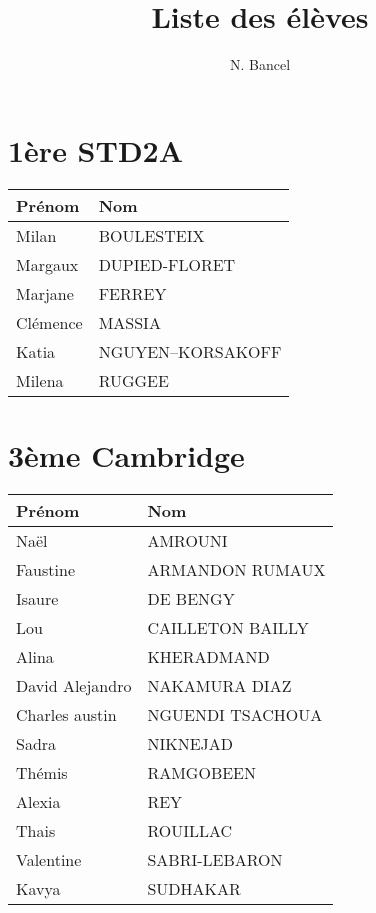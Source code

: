 \documentclass[a4paper,12pt]{article}
\begin{document}
\title{Liste des élèves}
\author{N. Bancel}

\sloppy  %
\maketitle

\section{1ère STD2A}

\begin{center}
  \begin{tabularx}{\textwidth}{||X X||}
    \hline
    \textbf{Prénom} & \textbf{Nom} \\
    \hline
    Milan & BOULESTEIX \\
    \hline
    Margaux & DUPIED-FLORET \\
    \hline
    Marjane & FERREY \\
    \hline
    Clémence & MASSIA \\
    \hline
    Katia & NGUYEN--KORSAKOFF \\
    \hline
    Milena & RUGGEE
  \end{tabularx}
  \end{center}


  \section{3ème Cambridge}

  \begin{center}
    \begin{tabularx}{\textwidth}{||X X||}
      \hline
      \textbf{Prénom} & \textbf{Nom} \\
      \hline
      Naël & AMROUNI  \\
      \hline
      Faustine & ARMANDON RUMAUX \\
      \hline
      Isaure & DE BENGY \\
      \hline
      Lou & CAILLETON BAILLY \\
      \hline
      Alina & KHERADMAND \\
      \hline
      David Alejandro & NAKAMURA DIAZ \\
      \hline
      Charles austin & NGUENDI TSACHOUA \\
      \hline
      Sadra & NIKNEJAD \\
      \hline
      Thémis & RAMGOBEEN \\
      \hline
      Alexia & REY \\
      \hline
      Thais & ROUILLAC \\
      \hline
      Valentine & SABRI-LEBARON \\
      \hline
      Kavya & SUDHAKAR
    \end{tabularx}
    \end{center}
  
    
\end{document}
